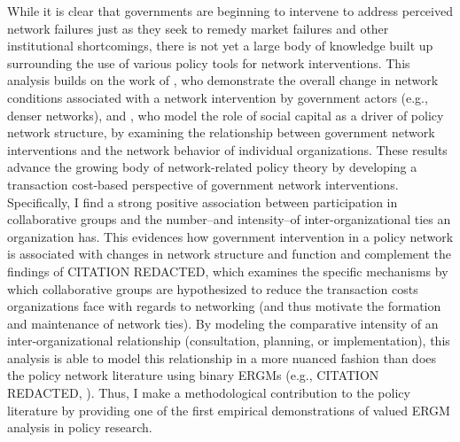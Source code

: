 \documentclass[12pt,a4paper,titlepage]{article}
\begin{document}
While it is clear that governments are beginning to intervene to address perceived network failures just as they seek to remedy market failures and other institutional shortcomings, there is not yet a large body of knowledge built up surrounding the use of various policy tools for network interventions. This analysis builds on the work of \textcite{schneider2003}, who demonstrate the overall change in network conditions associated with a network intervention by government actors (e.g., denser networks), and \textcite{henry2011}, who model the role of social capital as a driver of policy network structure, by examining the relationship between government network interventions and the network behavior of individual organizations.  These results advance the growing body of network-related policy theory by developing a transaction cost-based perspective of government network interventions. Specifically, I find a strong positive association between participation in collaborative groups and the number--and intensity--of inter-organizational ties an organization has. This evidences how government intervention in a policy network is associated with changes in network structure and function and complement the findings of CITATION REDACTED, which examines the specific mechanisms by which collaborative groups are hypothesized to reduce the transaction costs organizations face with regards to networking (and thus motivate the formation and maintenance of network ties). By modeling the comparative intensity of an inter-organizational relationship (consultation, planning, or implementation), this analysis is able to model this relationship in a more nuanced fashion than does the policy network literature using binary ERGMs (e.g., CITATION REDACTED, \cite{lubell2012, gerber2013, schneider2003}). Thus, I make a methodological contribution to the policy literature by providing one of the first empirical demonstrations of valued ERGM analysis in policy research.
\end{document}
